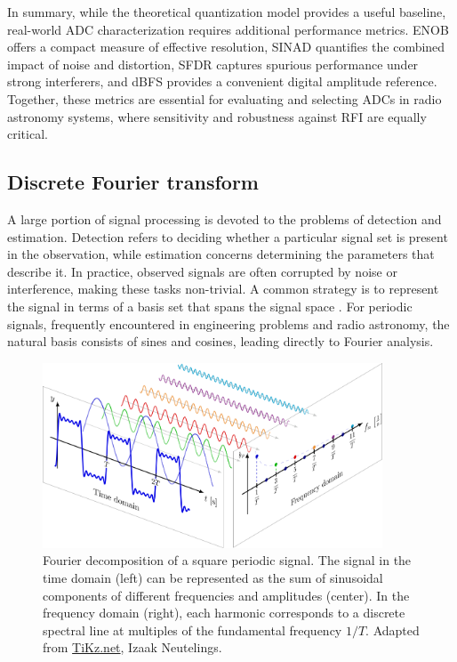 In summary, while the theoretical quantization model provides a useful baseline, real-world ADC characterization requires additional performance metrics. ENOB offers a compact measure of effective resolution, SINAD quantifies the combined impact of noise and distortion, SFDR captures spurious performance under strong interferers, and dBFS provides a convenient digital amplitude reference. Together, these metrics are essential for evaluating and selecting ADCs in radio astronomy systems, where sensitivity and robustness against RFI are equally critical.
\subsection{Discrete Fourier transform}
\label{sec:dft}
A large portion of signal processing is devoted to the problems of detection and estimation. Detection refers to deciding whether a particular signal set is present in the observation, while estimation concerns determining the parameters that describe it. In practice, observed signals are often corrupted by noise or interference, making these tasks non-trivial. A common strategy is to represent the signal in terms of a basis set that spans the signal space \citep{helstrom1968statistical}. For periodic signals, frequently encountered in engineering problems and radio astronomy, the natural basis consists of sines and cosines, leading directly to Fourier analysis.

\begin{figure}[h!]
	\centering
	\includegraphics[width=0.9\textwidth]{../figures/fourier_series-011.png}
	\caption[Fourier decomposition of a square periodic signal]{Fourier decomposition of a square periodic signal. The signal in the time domain (left) can be represented as the sum of sinusoidal components of different frequencies and amplitudes (center). In the frequency domain (right), each harmonic corresponds to a discrete spectral line at multiples of the fundamental frequency $1/T$. Adapted from \href{https://tikz.net/fourier_series/}{TiKz.net}, Izaak Neutelings.}
	\label{fig:fourier_decomposition}
\end{figure}

